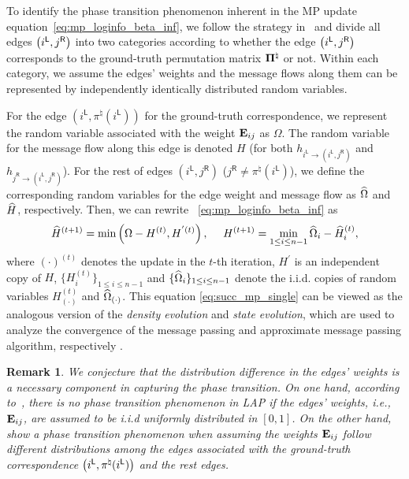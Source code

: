 \documentclass[11pt]{article}
\newtheorem{remark}{Remark}
\def\ln#1{{#1}^{\mathsf{L}}}
\def\rn#1{{#1}^{\mathsf{R}}}
\def\lloginfo#1#2{h_{\ln{#1}\rightarrow (\ln{#1}, \rn{#2})}}
\def\rloginfo#1#2{h_{\rn{#2}\rightarrow (\ln{#1}, \rn{#2})}}
\begin{document}
To identify the phase transition phenomenon inherent in the
MP update equation~\eqref{eq:mp_loginfo_beta_inf},
we follow the  strategy  in~\citet{semerjian2020recovery}
and divide all edges $\bracket{\ln{i}, \rn{j}}$ into two
categories according to
whether the edge $\bracket{\ln{i}, \rn{j}}$ corresponds to the ground-truth permutation matrix $\boldsymbol{\Pi}^{\natural}$ or not.
Within each category, we assume the edges' weights and
the message flows along them can be represented by independently identically distributed random variables.
\par
For the edge $(\ln{i}, \pi^{\natural}(\ln{i}))$ for the ground-truth correspondence, we represent
the random variable associated with the
weight $\mathbf{E}_{ij}$ as $\Omega$. The random variable for the message flow along this edge is denoted  $H$ (for both $\lloginfo{i}{j}$ and $\rloginfo{i}{j}$).
For the rest of edges $(\ln{i}, \rn{j})$ ($\rn{j}\neq \pi^{\natural}(\ln{i})$), we define the corresponding random variables for the edge weight and message flow as $\widehat{\Omega}$ and $\widehat{H}$, respectively. Then, we can rewrite ~\eqref{eq:mp_loginfo_beta_inf} as
\begin{align}
\widehat{H}^{(t+1)} = \min\left(\Omega - H^{(t)}, H^{'(t)}\right), ~~~~H^{(t+1)} = \min_{1\leq i \leq n-1} \widehat{\Omega}_i - \widehat{H}^{(t)}_i,
\label{eq:succ_mp_single}
\end{align}
where $(\cdot)^{(t)}$ denotes the update in the $t$-th iteration,
$H^{'}$ is an independent copy of $H$,
 $\{H_i^{(t)}\}_{1\leq i \leq n-1}$ and
$\{\widehat{\Omega}_i\}_{1\leq i \leq n-1}$ denote
the i.i.d. copies of random variables
$H_{(\cdot)}^{(t)}$ and $\widehat{\Omega}_{(\cdot)}$.
This equation \eqref{eq:succ_mp_single}
can be viewed as the analogous version
of the \emph{density evolution} and
\emph{state evolution},
which are used to analyze the convergence of
the message passing and approximate message
passing algorithm, respectively
\citep{chung2000construction, richardson2001capacity, richardson2008modern,  donoho2009message, maleki2010approximate, bayati2011dynamics, rangan2011generalized}.


\vspace{0.1in}

\begin{remark}
We conjecture that the distribution difference in the
edges' weights is a necessary component in capturing the phase
transition.
On one hand, according to~\citet{mezard1986mean,mezard1987solution,  parisi2002finite, linusson2004proof,mezard2009information, talagrand2010mean}, there is no phase transition phenomenon in LAP
if the edges' weights, i.e., $\mathbf{E}_{ij}$,
are assumed to be i.i.d uniformly distributed
in $[0, 1]$. On the other hand,~\citet{semerjian2020recovery} show a phase transition phenomenon when assuming the weights $\mathbf{E}_{ij}$
follow different distributions among the edges associated with the
ground-truth correspondence $\bracket{\ln{i}, \pi^{\natural}(\ln{i})}$
and the rest edges.
\end{remark}
\end{document}
